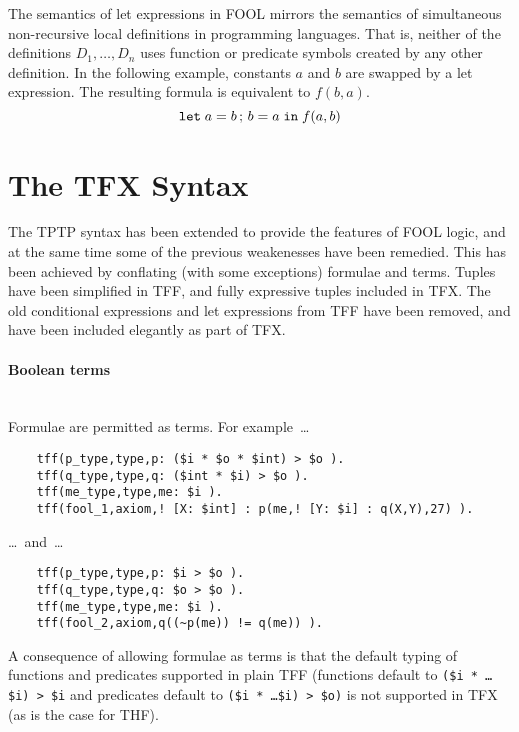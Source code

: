 \documentclass{easychair}
\begin{document}
The semantics of let expressions in FOOL mirrors the semantics of
simultaneous non-recursive local definitions in programming languages. That is,
neither of the definitions $D_1,\ldots,\allowbreak D_n$ uses function or
predicate symbols created by any other definition. In the following example,
constants $a$ and $b$ are swapped by a let expression. The resulting formula
is equivalent to $f(b, a)$.
\begin{equation}\label{eq:parallel-let-example}
\mathtt{let}\;{a}={b}\,;\,{b}={a}\;\mathtt{in}\;f(a, b)
\end{equation}

\section{The TFX Syntax}
\label{TFX}

The TPTP syntax has been extended to provide the features of FOOL logic,
and at the same time some of the previous weakenesses have been remedied.
This has been achieved by conflating (with some exceptions) formulae and 
terms. 
Tuples have been simplified in TFF, and fully expressive tuples included in 
TFX. 
The old conditional expressions and let expressions from TFF have been 
removed, and have been included elegantly as part of TFX. 

\paragraph{Boolean terms}~\\
Formulae are permitted as terms. For example~\ldots
\begin{verbatim}
    tff(p_type,type,p: ($i * $o * $int) > $o ).
    tff(q_type,type,q: ($int * $i) > $o ).
    tff(me_type,type,me: $i ).
    tff(fool_1,axiom,! [X: $int] : p(me,! [Y: $i] : q(X,Y),27) ).
\end{verbatim}
\ldots~and~\ldots
\begin{verbatim}
    tff(p_type,type,p: $i > $o ).
    tff(q_type,type,q: $o > $o ).
    tff(me_type,type,me: $i ).
    tff(fool_2,axiom,q((~p(me)) != q(me)) ).
\end{verbatim}
A consequence of allowing formulae as terms is that the default typing of 
functions and predicates supported in plain TFF (functions default to 
{\tt (\$i * \ldots * \$i) > \$i} and predicates default to 
{\tt (\$i * \ldots * \$i) > \$o)} is not supported in TFX (as is the case 
for THF).
\end{document}
